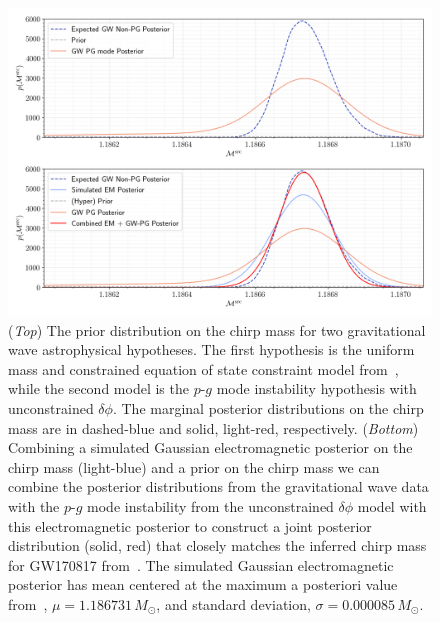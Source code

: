 \begin{figure}
\centering
\includegraphics[width=1.0\textwidth]{figs/chapter6/em_posterior_fix.png}
\caption{(\textit{Top}) The prior distribution on the chirp mass for two gravitational wave astrophysical hypotheses. The first hypothesis is the uniform mass and constrained equation of state constraint model from~\cite{de2018tidal}, while the second model is the $p$-$g$ mode instability hypothesis with unconstrained $\delta \phi$. The marginal posterior distributions on the chirp mass are in dashed-blue and solid, light-red, respectively. (\textit{Bottom}) Combining a simulated Gaussian electromagnetic posterior on the chirp mass (light-blue) and a prior on the chirp mass we can combine the posterior distributions from the gravitational wave data with the $p$-$g$ mode instability from the unconstrained $\delta \phi$ model with this electromagnetic posterior to construct a joint posterior distribution (solid, red) that closely matches the inferred chirp mass for GW170817 from~\cite{de2018tidal}. The simulated Gaussian electromagnetic posterior has mean centered at the maximum a posteriori value from~\cite{de2018tidal}, $\mu = 1.186731 \, M_\odot$, and standard deviation, $\sigma = 0.000085 \, M_\odot$.}
\label{fig:em_posterior_analysis}
\end{figure}

